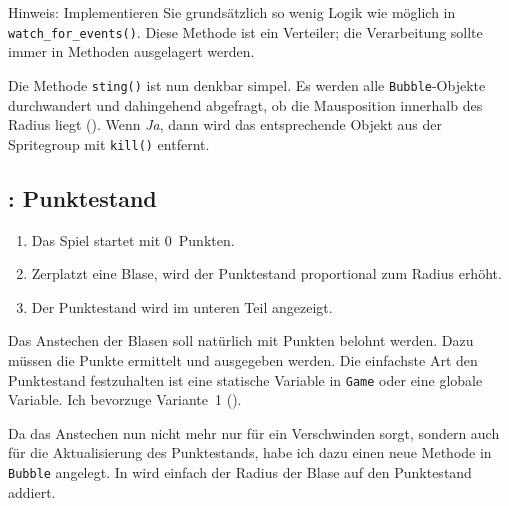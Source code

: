 Hinweis: Implementieren Sie grundsätzlich so wenig Logik wie möglich in \texttt{watch\_\-for\_\-e\-vents()}. Diese Methode ist ein Verteiler; die Verarbeitung sollte immer in Methoden ausgelagert werden.


Die Methode \texttt{sting()} ist nun denkbar simpel. Es werden alle \texttt{Bubble}-Objekte durchwandert und dahingehend abgefragt, ob die Mausposition innerhalb des Radius liegt (). Wenn \emph{Ja}, dann wird das entsprechende Objekt aus der Spritegroup mit \texttt{kill()} entfernt.


\subsection{: Punktestand}
    \begin{enumerate}
        \item Das Spiel startet mit 0~Punkten.\label{reqPunktestandNull}
        \item Zerplatzt eine Blase, wird der Punktestand proportional zum Radius erhöht.\label{reqPunktestandRadius}
        \item Der Punktestand wird im unteren Teil angezeigt.\label{reqPunktestandAnzeige}
    \end{enumerate}
\er

Das Anstechen der Blasen soll natürlich mit Punkten belohnt werden. Dazu müssen die Punkte ermittelt und ausgegeben werden. Die einfachste Art den Punktestand festzuhalten ist eine statische Variable in \texttt{Game} oder eine globale Variable. Ich bevorzuge Variante~1 (). 


Da das Anstechen nun nicht mehr nur für ein Verschwinden sorgt, sondern auch für die Aktualisierung des Punktestands, habe ich dazu einen neue Methode in \texttt{Bubble} angelegt. In  wird einfach der Radius der Blase auf den Punktestand addiert.

